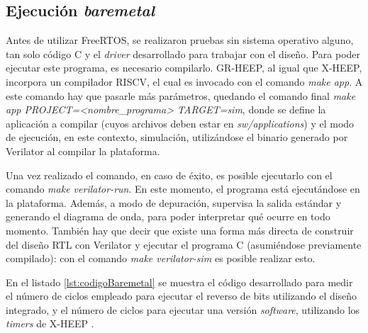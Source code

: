 \subsection{Ejecución \textit{baremetal}}
Antes de utilizar FreeRTOS, se realizaron pruebas sin sistema operativo alguno, tan solo código C y el \emph{driver} desarrollado para trabajar con el diseño. Para poder ejecutar este programa, es necesario compilarlo. GR-HEEP, al igual que X-HEEP, incorpora un compilador RISCV, el cual es invocado con el comando \emph{make app}. A este comando hay que pasarle más parámetros, quedando el comando final \emph{make app PROJECT=<nombre\_programa> TARGET=sim}, donde se define la aplicación a compilar (cuyos archivos deben estar en \emph{sw/applications}) y el modo de ejecución, en este contexto, simulación, utilizándose el binario generado por Verilator al compilar la plataforma.

Una vez realizado el comando, en caso de éxito, es posible ejecutarlo con el comando \emph{make verilator-run}. En este momento, el programa está ejecutándose en la plataforma. Además, a modo de depuración, supervisa la salida estándar y generando el diagrama de onda, para poder interpretar qué ocurre en todo momento. También hay que decir que existe una forma más directa de construir del diseño RTL con Verilator y ejecutar el programa C (asumiéndose previamente compilado): con el comando \emph{make verilator-sim} es posible realizar esto. 

En el listado \ref{lst:codigoBaremetal} se muestra el código desarrollado para medir el número de ciclos empleado para ejecutar el reverso de bits utilizando el diseño integrado, y el número de ciclos para ejecutar una versión \textit{software}, utilizando los \textit{timers} de X-HEEP \cite{timer-sdk}. 

